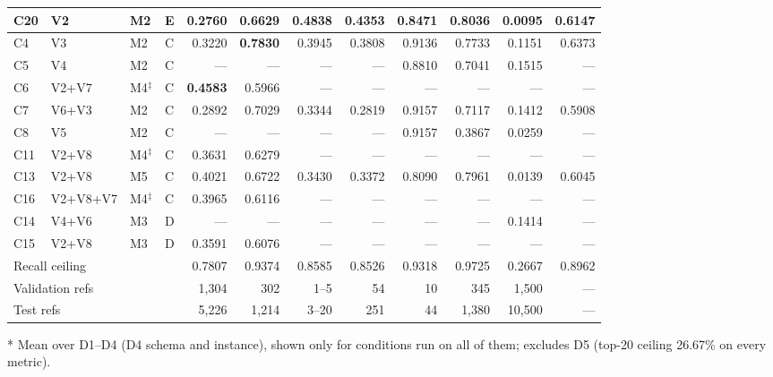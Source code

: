 \begin{table}[t]
\begin{threeparttable}
\begin{tabular}{llllrrrrrrrr}
\hline
C20 & V2 & M2 & E & 0.2760 & 0.6629 & 0.4838 & 0.4353 & 0.8471 & 0.8036 & 0.0095 & 0.6147 \\
\hline
C4 & V3 & M2 & C & 0.3220 & \textbf{0.7830} & 0.3945 & 0.3808 & 0.9136 & 0.7733 & 0.1151 & 0.6373 \\
C5 & V4 & M2 & C & --- & --- & --- & --- & 0.8810 & 0.7041 & 0.1515 & --- \\
C6 & V2+V7 & M4$^\ddagger$ & C & \textbf{0.4583} & 0.5966 & --- & --- & --- & --- & --- & --- \\
C7 & V6+V3 & M2 & C & 0.2892 & 0.7029 & 0.3344 & 0.2819 & 0.9157 & 0.7117 & 0.1412 & 0.5908 \\
C8 & V5 & M2 & C & --- & --- & --- & --- & 0.9157 & 0.3867 & 0.0259 & --- \\
C11 & V2+V8 & M4$^\ddagger$ & C & 0.3631 & 0.6279 & --- & --- & --- & --- & --- & --- \\
C13 & V2+V8 & M5 & C & 0.4021 & 0.6722 & 0.3430 & 0.3372 & 0.8090 & 0.7961 & 0.0139 & 0.6045 \\
C16 & V2+V8+V7 & M4$^\ddagger$ & C & 0.3965 & 0.6116 & --- & --- & --- & --- & --- & --- \\
\hline
C14 & V4+V6 & M3 & D & --- & --- & --- & --- & --- & --- & 0.1414 & --- \\
C15 & V2+V8 & M3 & D & 0.3591 & 0.6076 & --- & --- & --- & --- & --- & --- \\
\hline
\multicolumn{4}{l}{Recall ceiling} & 0.7807 & 0.9374 & 0.8585 & 0.8526 & 0.9318 & 0.9725 & 0.2667 & 0.8962 \\
\multicolumn{4}{l}{Validation refs} & 1,304 & 302 & 1--5 & 54 & 10 & 345 & 1,500 & --- \\
\multicolumn{4}{l}{Test refs} & 5,226 & 1,214 & 3--20 & 251 & 44 & 1,380 & 10,500 & --- \\
\hline
\end{tabular}
\begin{tablenotes}
\item[*] Mean over D1--D4 (D4 schema and instance), shown only for conditions run on all of them; excludes D5 (top-20 ceiling 26.67\% on every metric).
\end{tablenotes}
\end{threeparttable}
\end{table}
